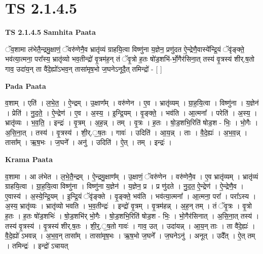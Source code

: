 \documentclass[17pt]{extarticle}
\begin{document}
\section*{ TS 2.1.4.5 }

\textbf{TS 2.1.4.5 } \newline
\textbf{Samhita Paata} \newline

ॅव॒शामा ल॑भेतै॒न्द्रमु॒क्षाणं॒ ॅवरु॑णेनै॒व भ्रातृ॑व्यं ग्राहयि॒त्वा विष्णु॑ना य॒ज्ञेन॒ प्रणु॑दत ऐ॒न्द्रेणै॒वास्ये᳚न्द्रि॒यं ॅवृ॑ङ्क्ते॒ भव॑त्या॒त्मना॒ परा᳚स्य॒ भ्रातृ॑व्यो भव॒तीन्द्रो॑ वृ॒त्रम॑ह॒न् तं ॅवृ॒त्रो ह॒तः षो॑ड॒शभि॑-र्भो॒गैर॑सिना॒त् तस्य॑ वृ॒त्रस्य॑ शीर्.ष॒तो गाव॒ उदा॑य॒न् ता वै॑दे॒ह्यो॑ऽभव॒न् तासा॑मृष॒भो ज॒घनेऽनूदै॒त् तमिन्द्रो॑ - [  ] \newline

\textbf{Pada Paata} \newline

व॒शाम् । एति॑ । ल॒भे॒त॒ । ऐ॒न्द्रम् । उ॒क्षाण᳚म् । वरु॑णेन । ए॒व । भ्रातृ॑व्यम् । ग्रा॒ह॒यि॒त्वा । विष्णु॑ना । य॒ज्ञेन॑ । प्रेति॑ । नु॒द॒ते॒ । ऐ॒न्द्रेण॑ । ए॒व । अ॒स्य॒ । इ॒न्द्रि॒यम् । वृ॒ङ्क्ते॒ । भव॑ति । आ॒त्मना᳚ । परेति॑ । अ॒स्य॒ । भ्रातृ॑व्यः । भ॒व॒ति॒ । इन्द्रः॑ । वृ॒त्रम् । अ॒ह॒न्न् । तम् । वृ॒त्रः । ह॒तः । षो॒ड॒शभि॒रिति॑ षोड॒श - भिः॒ । भो॒गैः । अ॒सि॒ना॒त् । तस्य॑ । वृ॒त्रस्य॑ । शी॒र्.॒ष॒तः । गावः॑ । उदिति॑ । आ॒य॒न्न् । ताः । वै॒दे॒ह्यः॑ । अ॒भ॒व॒न्न् । तासा᳚म् । ऋ॒ष॒भः । ज॒घने᳚ । अनु॑ । उदिति॑ । ऐ॒त् । तम् । इन्द्रः॑ ।  \newline


\textbf{Krama Paata} \newline

व॒शामा । आ ल॑भेत । ल॒भे॒तै॒न्द्रम् । ऐ॒न्द्रमु॒क्षाण᳚म् । उ॒क्षाणं॒ ॅवरु॑णेन । वरु॑णेनै॒व । ए॒व भ्रातृ॑व्यम् । भ्रातृ॑व्यं ग्राहयि॒त्वा । ग्रा॒॒ह॒यि॒त्वा विष्णु॑ना । विष्णु॑ना य॒ज्ञेन॑ । य॒ज्ञेन॒ प्र । प्र णु॑दते । नु॒द॒त॒ ऐ॒न्द्रेण॑ । ऐ॒न्द्रेणै॒व । ए॒वास्य॑ । अ॒स्ये॒न्द्रि॒यम् । इ॒न्द्रि॒यं ॅवृ॑ङ्क्ते । वृ॒ङ्क्ते॒ भव॑ति । भव॑त्या॒त्मना᳚ । आ॒त्मना॒ परा᳚ । परा᳚ऽस्य । अ॒स्य॒ भ्रातृ॑व्यः । भ्रातृ॑व्यो भवति । भ॒व॒तीन्द्रः॑ । इन्द्रो॑ वृ॒त्रम् । वृ॒त्रम॑हन्न् । अ॒ह॒न् तम् । तं ॅवृ॒त्रः । वृ॒त्रो ह॒तः । ह॒तः षो॑ड॒शभिः॑ । षो॒ड॒शभि॑र् भो॒गैः । षो॒ड॒शभि॒रिति॑ षोड॒श - भिः॒ । भो॒गैर॑सिनात् । अ॒सि॒ना॒त् तस्य॑ । तस्य॑ वृ॒त्रस्य॑ । वृ॒त्रस्य॑ शीर्.ष॒तः । शी॒र्॒.॒ष॒तो गावः॑ । गाव॒ उत् । उदा॑यन्न् । आ॒य॒न् ताः । ता वै॑दे॒ह्यः॑ । वै॒दे॒ह्यो॑ ऽभवन्न् । अ॒भ॒व॒न् तासा᳚म् । तासा॑मृष॒भः । ऋ॒ष॒भो ज॒घने᳚ । ज॒घनेऽनु॑ । अनूत् । उदै᳚त् । ऐ॒त् तम् । तमिन्द्रः॑ । इन्द्रो॑ ऽचायत् \newline
\end{document}
